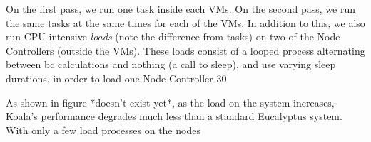 On the first pass, we run one task inside each VMs.  On the second pass, we run the same tasks at the same times for each of the VMs.  In addition to this, we also run CPU intensive \emph{loads} (note the difference from tasks) on two of the Node Controllers (outside the VMs).  These loads consist of a looped process alternating between bc calculations and nothing (a call to sleep), and use varying sleep durations, in order to load one Node Controller 30%

As shown in figure *doesn't exist yet*, as the load on the system increases, Koala's performance degrades much less than a standard Eucalyptus system.  With only a few load processes on the nodes